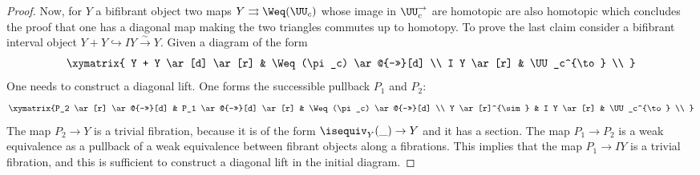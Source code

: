 \begin{proof}
Now, for $Y$ a bifibrant object two maps $Y \rightrightarrows \Weq(\UU_c)$ whose image in $\UU^{\to}_c$ are homotopic are also homotopic which concludes the proof that one has a diagonal map making the two triangles commutes up to homotopy. To prove the last claim consider a bifibrant interval object $Y + Y \hookrightarrow IY \overset{\sim}{\to} Y$. Given a diagram of the form 
\[
\xymatrix{
Y + Y \ar[d] \ar[r] & \Weq(\pi_c) \ar@{->>}[d] \\
I Y \ar[r] & \UU_c^{\to} \\  }
\]
One needs to construct a diagonal lift. One forms the successible pullback $P_1$ and $P_2$:
\[
\xymatrix{P_2 \ar[r] \ar@{->>}[d] & P_1 \ar@{->>}[d] \ar[r] & \Weq(\pi_c) \ar@{->>}[d] \\
Y \ar[r]^{\sim} & I Y \ar[r] & \UU_c^{\to} \\ }
\]
The map $P_2 \rightarrow Y$ is a trivial fibration, because it is of the form $\isequiv_Y( \_) \to Y$ and it has a section. The map $P_1 \rightarrow P_2$ is a weak equivalence as a pullback of a weak equivalence between fibrant objects along a fibrations. This implies that the map $P_1 \to IY$ is a trivial fibration, and this is sufficient to construct a diagonal lift in the initial diagram.
\end{proof}

